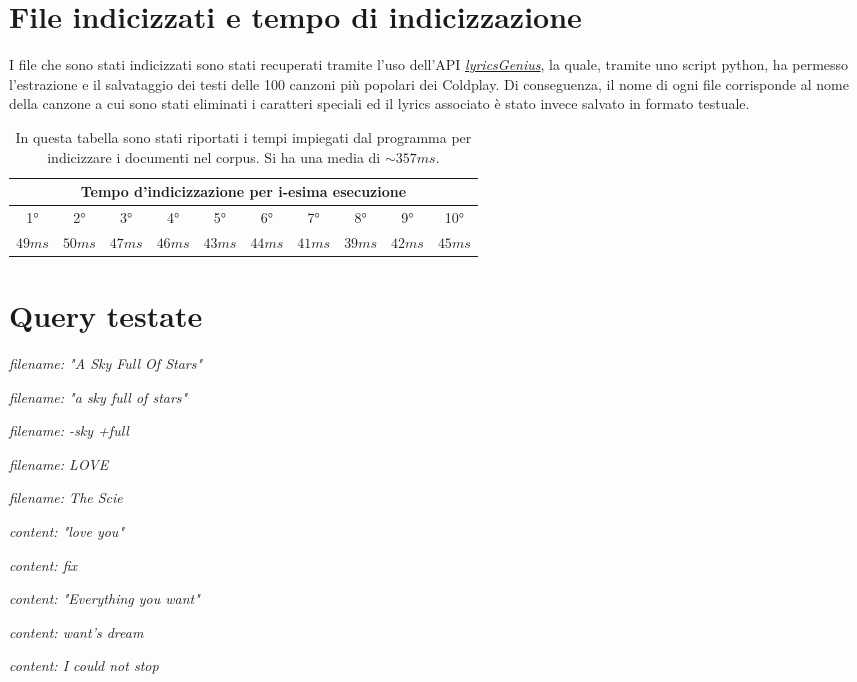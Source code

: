 \documentclass{article}
\begin{document}
\section{File indicizzati e tempo di indicizzazione}
I file che sono stati indicizzati sono stati recuperati tramite l'uso dell'API \href{https://lyricsgenius.readthedocs.io/en/master/}{\textit{lyricsGenius}}, la quale, tramite uno script python, ha permesso l'estrazione e il salvataggio dei testi delle 100 canzoni più popolari dei Coldplay. Di conseguenza, il nome di ogni file corrisponde al nome della canzone a cui sono stati eliminati i caratteri speciali ed il lyrics associato è stato invece salvato in formato testuale.
\begingroup
\setlength{\tabcolsep}{5pt} %
\renewcommand{\arraystretch}{1.5} %
\begin{center}
\begin{table}[h!]
    \begin{tabular}{|c|c|c|c|c|c|c|c|c|c|}
    \hline
    \multicolumn{10}{|c|}{Tempo d'indicizzazione per i-esima esecuzione}\\
    \hline
    1° & 2° & 3° & 4° & 5° & 6° & 7° & 8° & 9° & 10° \\
    \hline
        $49ms$ & $50ms$ & $47ms$ & $46ms$ & $43ms$ & $44ms$ & $41ms$ & $39ms$ & $42ms$ & $45ms$ \\
    \hline
    \end{tabular}
    \caption{In questa tabella sono stati riportati i tempi impiegati dal programma per indicizzare i documenti nel corpus. Si ha una media di $\sim{357ms}$.}
\end{table}
\end{center}
\endgroup

\section{Query testate}
\textit{filename: "A Sky Full Of Stars"}

\textit{filename: "a sky full of stars"}

\textit{filename: -sky +full}

\textit{filename: LOVE}

\textit{filename: The Scie}

\textit{content: "love you"}

\textit{content: fix}

\textit{content: "Everything you want"}

\textit{content: want's dream}

\textit{content: I could not stop}
\end{document}
